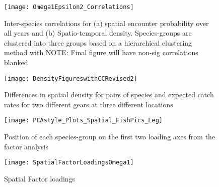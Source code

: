\documentclass{nature}
\begin{document}




\begin{figure}
\begin{center}
	\texttt{[image: Omega1Epsilon2\_Correlations]}
	\label{fig:1}
	\caption{Inter-species correlations for (a) spatial encounter
		probability over all years and (b) Spatio-temporal density.
		Species-groups are clustered into three groups based on a
		hierarchical clustering method with NOTE: Final figure will
		have non-sig correlations blanked}
\end{center}
\end{figure}

\begin{figure}
\begin{center}
	\texttt{[image: DensityFigureswithCCRevised2]}
	\label{fig:2}
	\caption{Differences in spatial density for pairs of species and
		expected catch rates for two different gears at three different
	locations}
\end{center}
\end{figure}

\begin{figure}
\begin{center}
	\texttt{[image: PCAstyle\_Plots\_Spatial\_FishPics\_Leg]}
	\label{fig:3}
	\caption{Position of each species-group on the first two loading axes from the
	factor analysis}
\end{center}
\end{figure}


\begin{figure}
\begin{center}
	\texttt{[image: SpatialFactorLoadingsOmega1]}
	\label{fig:4}
	\caption{Spatial Factor loadings}
\end{center}
\end{figure}
\end{document}
